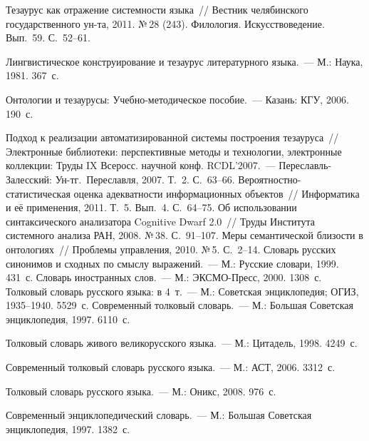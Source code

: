 \begin{multicols}{2}
{\small\frenchspacing
{%
\begin{thebibliography}{99}
      
 Тезаурус как отражение системности языка~// Вестник 
челябинского государственного ун-та, 2011. №\,28 (243). Филология. 
Искусствоведение. Вып.~59. С.~52--61.

 Лингвистическое конструирование и тезаурус 
литературного языка.~--- М.: Наука, 1981. 367~с.

 Онтологии 
и тезаурусы: Учеб\-но-ме\-то\-ди\-че\-ское пособие.~--- Казань: КГУ, 2006. 190~с.

 Подход к реализации автоматизированной системы 
построения тезауруса~// Электронные библиотеки: перспективные методы и 
технологии, электронные коллекции: Труды IX Всеросс. научной конф. 
RCDL'2007.~---  Переславль-Залесский: Ун-т\linebreak г.~Переславля, 2007. Т.~2. 
С.~63--66.
 Ве\-ро\-ят\-но\-ст\-но-ста\-ти\-сти\-че\-ская оценка 
адекватности информационных объектов~// Информатика и её применения, 
2011. Т.~5. Вып.~4. С.~64--75.
 Об использовании синтаксического 
анализатора Cognitive Dwarf 2.0~// Труды Института системного анализа РАН, 
2008. №\,38. С.~91--107. 
 Меры семантической близости в онтологиях~// Проблемы 
управления, 2010. №\,5. С.~2--14.
 Словарь русских синонимов и сходных по смыслу 
выражений.~--- М.: Русские словари, 1999. 431~с. 
 Словарь иностранных слов.~--- М.: ЭКС\-МО-Пресс, 2000. 
1308~с. 
 Толковый словарь русского языка: в 4~т.~--- М.: Советская 
энциклопедия; ОГИЗ, 1935--1940. 5529~с.
Современный толковый словарь.~--- М.: Большая Советская энциклопедия, 
1997. 6110~с.

 Толковый словарь живого великорусского языка.~--- М.: 
Цитадель, 1998. 4249~с. 

 Современный толковый словарь русского языка.~--- М.: 
АСТ, 2006. 3312~с.

 Толковый словарь русского языка.~--- М.: Оникс, 2008. 
976~с.

\label{end\stat}

Современный энциклопедический словарь.~--- М.: Большая Советская 
энциклопедия, 1997. 1382~с.
\end{thebibliography}
} }

\end{multicols}